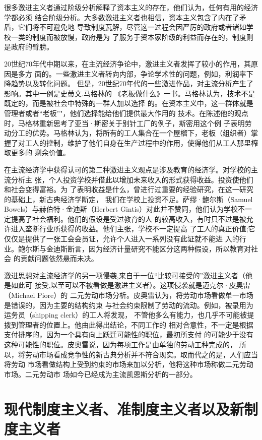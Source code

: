 很多激进主义者通过阶级分析解释了资本主义的存在，他们认为，任何有用的经济学都必须
结合阶级分析。大多数激进主义者也相信，资本主义包含了内在了矛盾，它们将不可避免地
导致制度瓦解，尽管这一过程会因严厉的政府或者诸如学校一类的制度而被放慢，政府是为
了服务于资本家阶级的利益而存在的，制度则是政府的臂膀。

20世纪70年代中期以来，在主流经济争论中，激进主义者发挥了较小的作用，其原因是多方
面的。一些激进主义者转向内部，争论学术性的问题，例如，利润率下降趋势以及转化问题。
但是，20世纪70年代的一些激进作品，对主流分析产生了影响。其中一例是史蒂文.马格林的
《老板做什么》一书。马格林认为，技术不是既定的，而是被社会中特殊的一群人加以选择
的。在资本主义中，这一群体就是管理者或者“老板”"，他们选择能给他们提供最大作用的
技术。在陈述他的观点时，马格林重新思考了亚当·斯密关于别针工厂的例子，斯密用这个例
子表明劳动分工的优势。马格林认为，将所有的工人集合在一个屋榴下，老板（组织者）掌
握了对工人的控制，维护了他们自身在生产过程中的作用，使得他们从工人那里榨取更多的
剩余价值。

在主流经济学中获得认可的第二种激进主义观点是涉及教育的经济学。对学校的主流分析主
张，个人投资学校并借此以增加未来收入的形式获得收益。投资使他们和社会变得富裕。为
了表明收益是什么，曾进行过重要的经验研究，在这一研究的基础上，新古典经济学断定，
我们在学校上投资不足。萨缪·鲍尔斯（Samuel Bowels）与赫伯特·金迪斯（Herbert
Gintis）对此并不赞同，他们认为学校不一定提高了社会福利。他们的假设是受过教育的人
的较高收入，有时只不过是被允许进入垄断行业所获得的收益。他们主张，学校不一定提高
了工人的真正价值;它仅仅是提供了一张工会会员证，允许个人进入一系列没有此证就不能进
入的行业。鲍尔斯与金迪斯断言，因为经济计量研究不能区分这两种假设，所以教育对社会
的贡献问题依然悬而未决。

激进思想对主流经济学的另一项侵袭,来自于一位“比较可接受的”激进主义者（他是如此可
接受,以至可以不被看做是激进主义者）。这项侵袭就是迈克尔·皮奥雷（Michael Piore）的
二元劳动市场分析。皮奥雷认为，将劳动市场看做单一市场是错误的，因为主要的结构约束
与社会约束限制了劳动的流动。例如，被录用为运务员（shipping clerk）的工人将发现，
不管他多么有能力，也几乎不可能被提拨到管理者的位置上。他由此得出结论，不同工作的
相对合意性，不一定是根据支付排序的，因为一个具有向上跃迁可能性的职位，最初所支付
的可能少于没有这种可能性的职位。皮奥雷说，因为每项工作是由单独的劳动工种完成的，
所以，将劳动市场看成竞争性的新古典分析并不符合现实。取而代之的是，人们应当将劳动
市场看做结构上受到约束的市场来加以分析，他将这种市场称做二元劳动市场。二元劳动市
场如今已经成为主流凯恩斯分析的一部分。

\section{现代制度主义者、准制度主义者以及新制度主义者}

